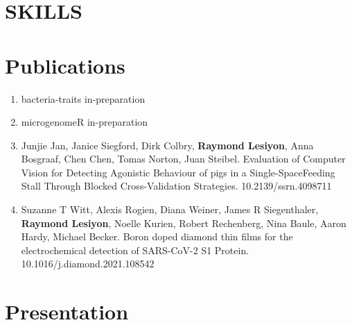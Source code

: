 \documentclass[12pt,a4paper,sans]{moderncv} %
\begin{document}
\section{SKILLS}




\section{Publications}

\begin{enumerate}
    \item bacteria-traits in-preparation
    \item microgenomeR in-preparation
    \item Junjie Jan, Janice Siegford, Dirk Colbry, \textbf{Raymond Lesiyon}, Anna Bosgraaf, Chen Chen, Tomas Norton, Juan Steibel. Evaluation of Computer Vision for Detecting Agonistic Behaviour of pigs in a Single-SpaceFeeding Stall Through Blocked Cross-Validation Strategies. 10.2139/ssrn.4098711
    \item Suzanne T Witt, Alexis Rogien, Diana Weiner, James R Siegenthaler, \textbf{Raymond Lesiyon}, Noelle Kurien, Robert Rechenberg, Nina Baule, Aaron Hardy, Michael Becker. Boron doped diamond thin films for the electrochemical detection of SARS-CoV-2 S1 Protein. 10.1016/j.diamond.2021.108542
\end{enumerate}


\section{Presentation}
\end{document}

